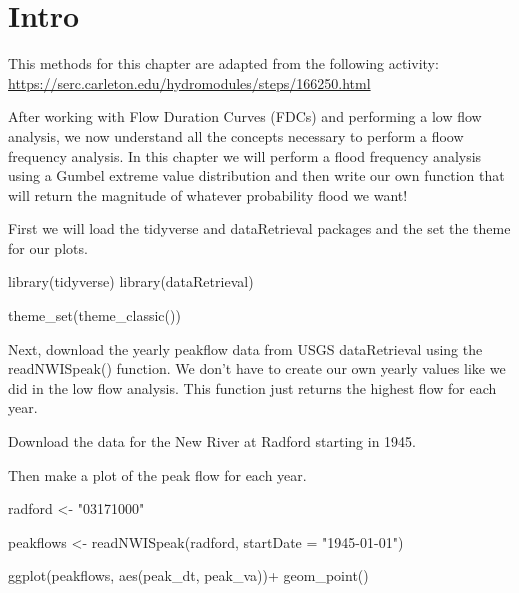 \documentclass[
]{book}
\newenvironment{Shaded}{\begin{snugshade}}{\end{snugshade}}
\newcommand{\AttributeTok}[1]{\textcolor[rgb]{0.77,0.63,0.00}{#1}}
\newcommand{\FunctionTok}[1]{\textcolor[rgb]{0.00,0.00,0.00}{#1}}
\newcommand{\NormalTok}[1]{#1}
\newcommand{\OtherTok}[1]{\textcolor[rgb]{0.56,0.35,0.01}{#1}}
\newcommand{\SpecialCharTok}[1]{\textcolor[rgb]{0.00,0.00,0.00}{#1}}
\newcommand{\StringTok}[1]{\textcolor[rgb]{0.31,0.60,0.02}{#1}}
\begin{document}
\hypertarget{intro}{%
\section{Intro}\label{intro}}

This methods for this chapter are adapted from the following activity:
\url{https://serc.carleton.edu/hydromodules/steps/166250.html}

After working with Flow Duration Curves (FDCs) and performing a low flow analysis, we now understand all the concepts necessary to perform a floow frequency analysis. In this chapter we will perform a flood frequency analysis using a Gumbel extreme value distribution and then write our own function that will return the magnitude of whatever probability flood we want!

First we will load the tidyverse and dataRetrieval packages and the set the theme for our plots.

\begin{Shaded}
\begin{Highlighting}[]
\FunctionTok{library}\NormalTok{(tidyverse)}
\FunctionTok{library}\NormalTok{(dataRetrieval)}

\FunctionTok{theme\_set}\NormalTok{(}\FunctionTok{theme\_classic}\NormalTok{())}
\end{Highlighting}
\end{Shaded}

Next, download the yearly peakflow data from USGS dataRetrieval using the readNWISpeak() function. We don't have to create our own yearly values like we did in the low flow analysis. This function just returns the highest flow for each year.

Download the data for the New River at Radford starting in 1945.

Then make a plot of the peak flow for each year.

\begin{Shaded}
\begin{Highlighting}[]
\NormalTok{radford }\OtherTok{\textless{}{-}} \StringTok{"03171000"}

\NormalTok{peakflows }\OtherTok{\textless{}{-}} \FunctionTok{readNWISpeak}\NormalTok{(radford, }\AttributeTok{startDate =} \StringTok{"1945{-}01{-}01"}\NormalTok{)}

\FunctionTok{ggplot}\NormalTok{(peakflows, }\FunctionTok{aes}\NormalTok{(peak\_dt, peak\_va))}\SpecialCharTok{+}
  \FunctionTok{geom\_point}\NormalTok{()}
\end{Highlighting}
\end{Shaded}
\end{document}
